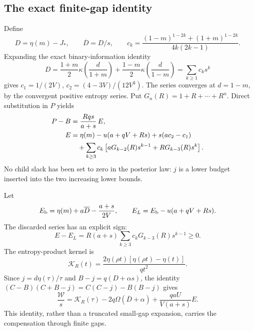 \documentclass[11pt]{article}
\theoremstyle{remark}\newtheorem{remark}[theorem]{Remark}
\numberwithin{equation}{section}
\begin{document}
\subsection{The exact finite-gap identity}
Define
\[
 D=\eta(m)-J_*,\qquad \overline D=D/s,\qquad
 c_k=\frac{(1-m)^{1-2k}+(1+m)^{1-2k}}{4k(2k-1)}.
\]
Expanding the exact binary-information identity
\begin{equation}\label{eq:I16-D}
 D=\frac{1+m}{2}\kappa\!\left(\frac d{1+m}\right)
  +\frac{1-m}{2}\kappa\!\left(\frac d{1-m}\right)
  =\sum_{k\ge1}c_ks^k
\end{equation}
gives $c_1=1/(2V)$, $c_2=(4-3V)/(12V^3)$. The series converges at
$d=1-m$, by the convergent positive entropy series. Put
$G_n(R)=1+R+\cdots+R^n$. Direct substitution in $P$ yields
\begin{align}
 P-B&=\frac{Rq s}{a+s}\,E,\label{eq:I16-P-E}\\
 E&=\eta(m)-u(a+qV+Rs)+s(ac_2-c_1)\notag\\
 &\quad+\sum_{k\ge3}c_k
       \left[aG_{k-2}(R)s^{k-1}+RG_{k-3}(R)s^k\right].\label{eq:I16-E}
\end{align}
No child slack has been set to zero in the posterior law: $j$ is a lower
budget inserted into the two increasing lower bounds.

Let
\begin{equation}\label{eq:I16-E-L}
 E_{\rm b}=\eta(m)+a\overline D-\frac{a+s}{2V},\qquad
 E_L=E_{\rm b}-u(a+qV+Rs).
\end{equation}
The discarded series has an explicit sign:
\begin{equation}\label{eq:I16-E-remainder}
 E-E_L=R(a+s)\sum_{k\ge3}c_kG_{k-3}(R)s^{k-1}\ge0.
\end{equation}
The entropy-product kernel is
\begin{equation}\label{eq:I16-kernel}
 \mathcal K_R(t)=
 \frac{2\eta(\rho t)[\eta(\rho t)-\eta(t)]}{q t^2}.
\end{equation}
Since $j=d\eta(\tau)/\tau$ and
$B-j=q(D+\alpha s)$, the identity
$(C-B)(C+B-j)=C(C-j)-B(B-j)$ gives
\begin{equation}\label{eq:I16-exact-W}
 \boxed{\frac{\mathcal W}{s}
 =\mathcal K_R(\tau)-2q\Omega(\overline D+\alpha)
 +\frac{qaU}{V(a+s)}E.}
\end{equation}
This identity, rather than a truncated small-gap expansion, carries the
compensation through finite gaps.
\end{document}
